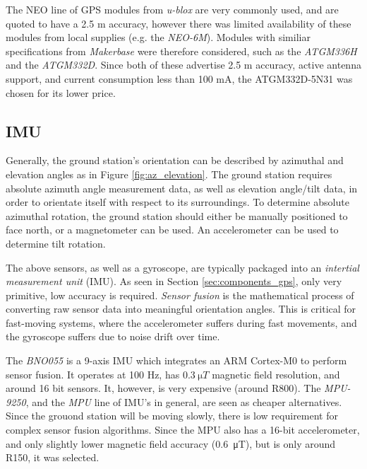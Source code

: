 The NEO line of GPS modules from \textit{u-blox} are very commonly used, and are quoted to have a 2.5 m accuracy, however there was limited availability of these modules from local supplies (e.g. the \textit{NEO-6M}). Modules with similiar specifications from \textit{Makerbase} were therefore considered, such as the \textit{ATGM336H} and the \textit{ATGM332D}. Since both of these advertise 2.5 m accuracy, active antenna support, and current consumption less than 100 mA, the ATGM332D-5N31 was chosen for its lower price.

\subsection{IMU}
Generally, the ground station's orientation can be described by azimuthal and elevation angles as in Figure \ref{fig:az_elevation}. The ground station requires absolute azimuth angle measurement data, as well as elevation angle/tilt data, in order to orientate itself with respect to its surroundings. To determine absolute azimuthal rotation, the ground station should either be manually positioned to face north, or a magnetometer can be used. An accelerometer can be used to determine tilt rotation.

The above sensors, as well as a gyroscope, are typically packaged into an \textit{intertial measurement unit} (IMU). As seen in Section \ref{sec:components_gps}, only very primitive, low accuracy is required. \textit{Sensor fusion} is the mathematical process of converting raw sensor data into meaningful orientation angles. This is critical for fast-moving systems, where the accelerometer suffers during fast movements, and the gyroscope suffers due to noise drift over time.

The \textit{BNO055} is a 9-axis IMU which integrates an ARM Cortex-M0 to perform sensor fusion. It operates at 100 Hz, has $\SI{0.3}{\micro T}$ magnetic field resolution, and around 16 bit sensors. It, however, is very expensive (around R800). The \textit{MPU-9250}, and the \textit{MPU} line of IMU's in general, are seen as cheaper alternatives. Since the grouond station will be moving slowly, there is low requirement for complex sensor fusion algorithms. Since the MPU also has a 16-bit accelerometer, and only slightly lower magnetic field accuracy (\SI{0.6}{\micro T}), but is only around R150, it was selected.

